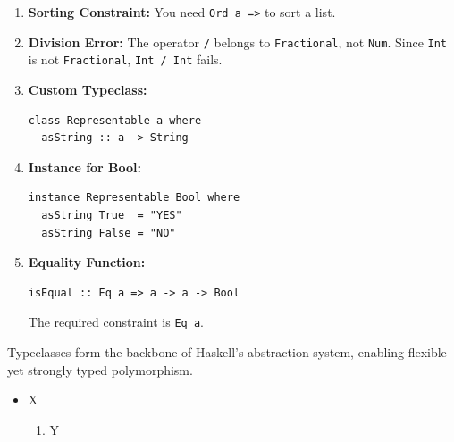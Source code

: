 \documentclass[12pt]{article}
\begin{document}
\begin{enumerate}
  \item \textbf{Sorting Constraint:} You need \texttt{Ord a =>} to sort a list.

  \item \textbf{Division Error:} The operator \texttt{/} belongs to \texttt{Fractional}, not \texttt{Num}. Since \texttt{Int} is not \texttt{Fractional}, \texttt{Int / Int} fails.

  \item \textbf{Custom Typeclass:}
        \begin{verbatim}
class Representable a where
  asString :: a -> String
\end{verbatim}

  \item \textbf{Instance for Bool:}
        \begin{verbatim}
instance Representable Bool where
  asString True  = "YES"
  asString False = "NO"
\end{verbatim}

  \item \textbf{Equality Function:}
        \begin{verbatim}
isEqual :: Eq a => a -> a -> Bool
\end{verbatim}
        The required constraint is \texttt{Eq a}.
\end{enumerate}

Typeclasses form the backbone of Haskell’s abstraction system, enabling flexible yet strongly typed polymorphism.

\begin{itemize}
  \item X
        \begin{enumerate}
          \item Y
        \end{enumerate}
\end{itemize}
\end{document}

